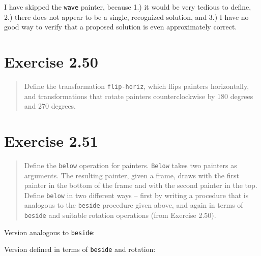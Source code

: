 \documentclass{article}
\begin{document}


I have skipped the \texttt{wave} painter, because 1.) it would be very tedious
to define, 2.) there does not appear to be a single, recognized solution, and
3.) I have no good way to verify that a proposed solution is even approximately
correct.

\section{Exercise 2.50}
\begin{quote}
    Define the transformation \texttt{flip-horiz}, which flips painters
    horizontally, and transformations that rotate painters counterclockwise by
    180 degrees and 270 degrees.
\end{quote}



\section{Exercise 2.51}
\begin{quote}
    Define the \texttt{below} operation for painters. \texttt{Below} takes two
    painters as arguments. The resulting painter, given a frame, draws with the
    first painter in the bottom of the frame and with the second painter in the
    top. Define \texttt{below} in two different ways -- first by writing a
    procedure that is analogous to the \texttt{beside} procedure given above,
    and again in terms of \texttt{beside} and suitable rotation operations
    (from Exercise 2.50).
\end{quote}

Version analogous to \texttt{beside}:


Version defined in terms of \texttt{beside} and rotation:

\end{document}
